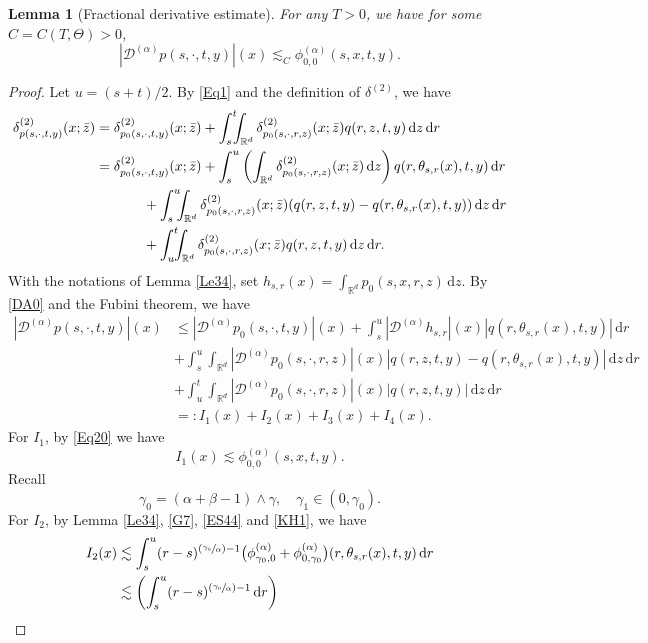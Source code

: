 \documentclass[11pt]{article}
\numberwithin{equation}{section}\providecommand{\asymp}{\mathrel{\sim}}
\newcommand{\Psfrac}[2]{(\sfrac{#1}{#2})}
\theoremstyle{plain}
\newtheorem{lemma}[theorem]{Lemma}
\theoremstyle{definition}
\newcommand\cD{{\mathcal D}}
\newcommand\mR{\mathbb{R}}
\newcommand\1{{\mathbf{1}}}
\newcommand{\dif}{\,\mathrm{d}}
\begin{document}
\begin{lemma}[Fractional derivative estimate]\label{Le35}
For any $T>0$, we have for some $C=C(T,\Theta)>0$,
\[
|\cD^{(\alpha)}p(s,\cdot,t,y)|(x)\lesssim_C \phi^{(\alpha)}_{0,0}(s,x,t,y).
\]
\end{lemma}
\begin{proof}
Let $u=(s+t)/2$. By \eqref{Eq1} and the definition of $\delta^{(2)}$, we have
\begin{align*}
\delta^{(2)}_{p(s,\cdot,t,y)}(x;\bar z)&=
\delta^{(2)}_{p_0(s,\cdot,t,y)}(x;\bar z)+\int^t_{s}\!\!\!\int_{\mR^d}\delta^{(2)}_{p_0(s,\cdot,r,z)}(x;\bar z)q(r,z,t,y)\dif z\dif r\\
&=\delta^{(2)}_{p_0(s,\cdot,t,y)}(x;\bar z)+\int^u_{s}\left(\int_{\mR^d}\delta^{(2)}_{p_0(s,\cdot,r,z)}(x;\bar z)\dif z\right)q(r,\theta_{s,r}(x),t,y)\dif r\\
&\hspace*{1.2cm}+\int^u_{s}\!\!\!\int_{\mR^d}\delta^{(2)}_{p_0(s,\cdot,r,z)}(x;\bar z)(q(r,z,t,y)-q(r,\theta_{s,r}(x),t,y))\dif z\dif r\\
&\hspace*{1.2cm}+\int^t_u\!\!\!\int_{\mR^d}\delta^{(2)}_{p_0(s,\cdot,r,z)}(x;\bar z)q(r,z,t,y)\dif z\dif r.
\end{align*}
With the notations of Lemma \ref{Le34}, set
$h_{s,r}(x)=\int_{\mR^d}p_0(s,x,r,z)\dif z$. By \eqref{DA0} and the Fubini theorem, we have
\begin{align*}
|\cD^{(\alpha)} p(s,\cdot,t,y)|(x)
&\leq|\cD^{(\alpha)} p_0(s,\cdot,t,y)|(x)+\int^u_s |\cD^{(\alpha)}h_{s,r}|(x)|q(r,\theta_{s,r}(x),t,y)|\dif r
\\&+\int^u_s\!\!\!\int_{\mR^d}|\cD^{(\alpha) }p_0(s,\cdot,r,z)|(x)|q(r,z,t,y)-q(r,\theta_{s,r}(x),t,y)|\dif z\dif r
\\&+\int^t_u\!\!\!\int_{\mR^d}|\cD^{(\alpha) }p_0(s,\cdot,r,z)|(x)|q(r,z,t,y)|\dif z\dif r\\
&=:I_1(x)+I_2(x)+I_3(x)+I_4(x).
\end{align*}
For $I_1$, by \eqref{Eq20} we have
\[
I_1(x)\lesssim \phi^{(\alpha)}_{0,0}(s,x,t,y).
\]
Recall
\[
\gamma_0{=}(\alpha+\beta-1)\wedge\gamma,\quad \gamma_1\in(0,\gamma_0).
\]
For $I_2$, by Lemma \ref{Le34}, \eqref{G7}, \eqref{ES44} and \eqref{KH1}, we have
\begin{align*}
I_2(x)&\lesssim\int^u_s(r-s)^{\Psfrac{\gamma_0}{\alpha}-1}\bigl(\phi^{(\alpha)}_{\gamma_0,0}
+\phi^{(\alpha)}_{0,\gamma_0}\bigr)(r,\theta_{s,r}(x),t,y)\dif r
\\&\lesssim\biggl(\int^u_s(r-s)^{\Psfrac{\gamma_0}{\alpha}-1}\dif r\biggr)

\end{align*}
\end{proof}
\end{document}
